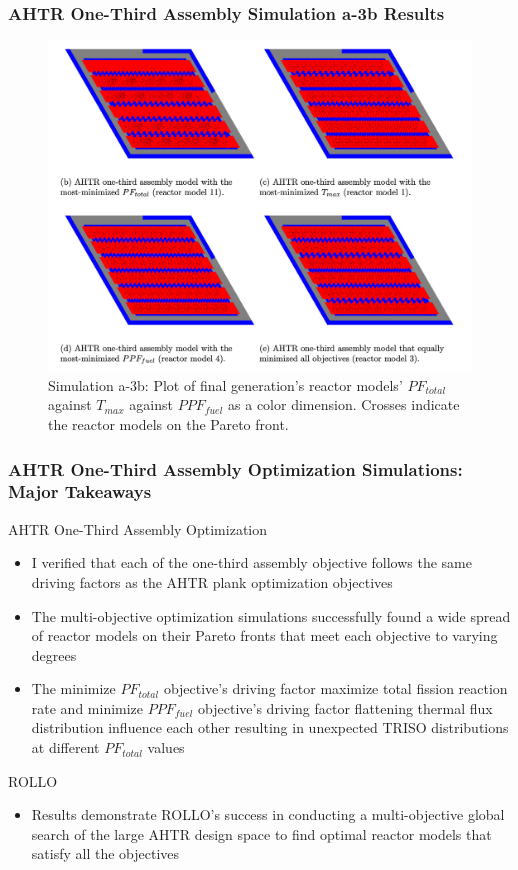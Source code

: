\begin{frame}
    \frametitle{AHTR One-Third Assembly Simulation a-3b Results}
    \begin{figure}
        \includegraphics[width=0.8\linewidth]{figures/assem-obj-3.png} 
        \caption{Simulation a-3b: Plot of final generation's reactor models' 
        $PF_{total}$ against $T_{max}$ against $PPF_{fuel}$ as a color dimension. 
        Crosses indicate the reactor models on the Pareto front.}
    \end{figure}
\end{frame}

\begin{frame}
    \frametitle{AHTR One-Third Assembly Optimization Simulations: Major Takeaways}
    \begin{block}{AHTR One-Third Assembly Optimization}
        \begin{itemize}
            \item I verified that each of the one-third assembly objective follows 
            the same driving factors as the AHTR plank optimization objectives
            \item The multi-objective optimization simulations successfully found a 
            wide spread of reactor models on their Pareto fronts that meet each 
            objective to varying degrees
            \item The minimize $PF_{total}$ objective's driving factor maximize 
            total fission reaction rate and minimize $PPF_{fuel}$ objective's driving 
            factor flattening thermal flux distribution influence each other resulting 
            in unexpected TRISO distributions at different $PF_{total}$ values 
        \end{itemize}
    \end{block}
    \begin{block}{ROLLO}
        \begin{itemize}
            \item  Results demonstrate ROLLO's success in conducting a multi-objective 
            global search of the large AHTR design space to find optimal reactor models 
            that satisfy all the objectives
        \end{itemize}
    \end{block}

\end{frame}